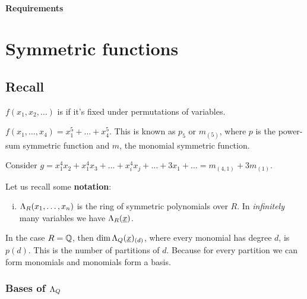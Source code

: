 \documentclass[12pt]{memoir}
\begin{document}
\maketitle
{\small
\setlength{\parindent}{0em}
\setlength{\parskip}{1em}



\subsubsection*{Requirements}

}
\newpage
\tableofcontents
\chapter{Symmetric functions}

\section{Recall}

\begin{Def}
$f(x_1,x_2,\dots)$ is  if it's fixed under permutations of variables.
\end{Def}

\begin{Ex}
    $f(x_1,\dots,x_4)=x_1^5+\dots+x_4^5$. This is known as $p_5$ or $m_{(5)}$, where $p$ is the power-sum symmetric function and $m$, the monomial symmetric function.  
\end{Ex}

\begin{Ex}
    Consider $g=x_1^4x_2+x_1^4x_3+\dots+x_i^4x_j+\dots+3x_1+\dots=m_{(4,1)}+3m_{(1)}$.
\end{Ex}

Let us recall some \textbf{notation}:
\begin{enumerate}[i)]
    \itemsep=-0.4em
    \item $\Lambda_R(x_1,\dots,x_n)$ is the ring of symmetric polynomials over $R$. In \emph{infinitely} many variables we have $\Lambda_R(\underline{x})$.
\end{enumerate}

In the case $R=\mathbb{Q}$, then $\dim \Lambda_Q(\underline x)_{(d)}$, where every monomial has degree $d$, is $p(d)$. This is the number of partitions of $d$. Because for every partition we can form monomials and monomials form a basis.

\subsection*{Bases of $\Lambda_Q$}
\end{document}

